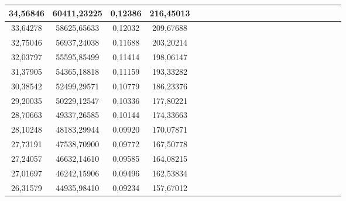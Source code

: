 \documentclass[10pt,a4paper]{article}
\begin{document}
\begin{center}
\begin{center}
\begin{table}[h!]
\begin{tabular}{|c|c|c|c|c|c|c|c|c|c|c|c|c|c|c|c|c|c|c|c|c|c|}
34,56846                    & 60411,23225                   & 0,12386                                      & 216,45013                   \\ \hline
33,64278                    & 58625,65633                   & 0,12032                                      & 209,67688                   \\ \hline
32,75046                    & 56937,24038                   & 0,11688                                      & 203,20214                   \\ \hline
32,03797                    & 55595,85499                   & 0,11414                                      & 198,06147                   \\ \hline
31,37905                    & 54365,18818                   & 0,11159                                      & 193,33282                   \\ \hline
30,38542                    & 52499,29571                   & 0,10779                                      & 186,23376                   \\ \hline
29,20035                    & 50229,12547                   & 0,10336                                      & 177,80221                   \\ \hline
28,70663                    & 49337,26585                   & 0,10144                                      & 174,33663                   \\ \hline
28,10248                    & 48183,29944                   & 0,09920                                      & 170,07871                   \\ \hline
27,73191                    & 47538,70900                   & 0,09772                                      & 167,50778                   \\ \hline
27,24057                    & 46632,14610                   & 0,09585                                      & 164,08215                   \\ \hline
27,01697                    & 46242,15906                   & 0,09496                                      & 162,53834                   \\ \hline
26,31579                    & 44935,98410                   & 0,09234                                      & 157,67012                   \\ \hline
 \end{tabular}
 \end{table}
 \end{center}
 
\end{center}
\end{document}
